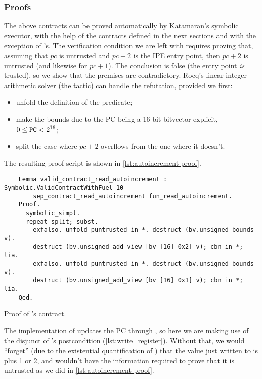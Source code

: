 \subsubsection{Proofs}
\label{sec:read-autoincrement-proof}

The above contracts can be proved automatically by Katamaran's symbolic executor, with the help of the contracts defined in the next sections and with the exception of 's. The verification condition we are left with requires proving that, assuming that \(\mathit{pc}\) is untrusted and \(\mathit{pc} + 2\) is the IPE entry point, then \(\mathit{pc} + 2\) is untrusted (and likewise for \(\mathit{pc} + 1\)). The conclusion is false (the entry point \emph{is} trusted), so we show that the premises are contradictory. Rocq's linear integer arithmetic solver (the  tactic) can handle the refutation, provided we first:
\begin{itemize}
\item unfold the definition of the  predicate;
\item make the bounds due to the PC being a 16-bit bitvector explicit, \ie \(0 \leq \reg{PC} < 2^{16}\);
\item split the case where \(\mathit{pc} + 2\) overflows from the one where it doesn't.
\end{itemize}
The resulting proof script is shown in \cref{lst:autoincrement-proof}.

\begin{listing}
  \begin{verbatim}
    Lemma valid_contract_read_autoincrement : Symbolic.ValidContractWithFuel 10
        sep_contract_read_autoincrement fun_read_autoincrement.
    Proof.
      symbolic_simpl.
      repeat split; subst.
      - exfalso. unfold puntrusted in *. destruct (bv.unsigned_bounds v).
        destruct (bv.unsigned_add_view [bv [16] 0x2] v); cbn in *; lia.
      - exfalso. unfold puntrusted in *. destruct (bv.unsigned_bounds v).
        destruct (bv.unsigned_add_view [bv [16] 0x1] v); cbn in *; lia.
    Qed.
  \end{verbatim}
  \caption{Proof of 's contract.}
  \label{lst:autoincrement-proof}
\end{listing}

The implementation of  updates the PC through , so here we are making use of the disjunct  of 's postcondition (\cref{lst:write_register}). Without that, we would ``forget'' (due to the existential quantification of ) that the value just written to  is  plus 1 or 2, and wouldn't have the information required to prove that it is untrusted as we did in \cref{lst:autoincrement-proof}.

